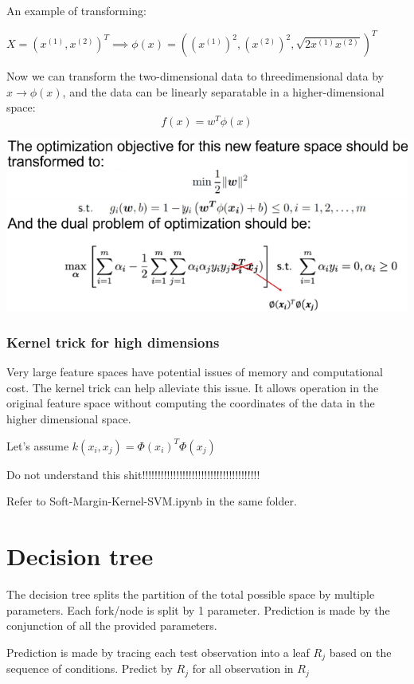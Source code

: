 \documentclass[letterpaper,12pt]{article}
\begin{document}
An example of transforming: 

$X = {(x^{(1)},x^{(2)})}^T \implies \phi(x)={((x^{(1)})^2,(x^{(2)})^2,\sqrt{2x^{(1)}x^{(2)}})}^T$

Now we can transform the two-dimensional data to three\-dimensional data by $x \to \phi (x)$, and the data can be linearly separatable in a higher-dimensional space:
\[
f(x)=w^T\phi(x)    
\]

\includegraphics*{./Image/Kernel space in SVM.png}

\subsubsection{Kernel trick for high dimensions}
Very large feature spaces have potential issues of memory and computational cost. The kernel trick can help alleviate this issue. It allows operation in the original feature space without computing the coordinates of the data in the higher dimensional space.

Let's assume $k(x_i,x_j) = \Phi (x_i)^T \Phi (x_j)  $

Do not understand this shit!!!!!!!!!!!!!!!!!!!!!!!!!!!!!!!!!!!!!!

Refer to Soft-Margin-Kernel-SVM.ipynb in the same folder. 



\section{Decision tree}

The decision tree splits the partition of the total possible space by multiple
parameters. Each fork/node is split by 1 parameter. Prediction is made by the
conjunction of all the provided parameters.

Prediction is made by tracing each test observation into a leaf $R_j$ based on
the sequence of conditions. Predict by $R_j$ for all observation in $R_j$
\end{document}
